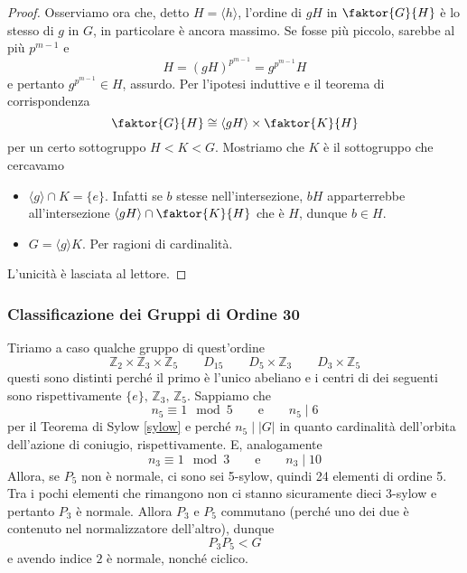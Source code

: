 \begin{multicols}{2}
\begin{proof}
	Osserviamo ora che, detto $ H = \langle h \rangle $, l'ordine di $ gH $ in $ \faktor{G}{H} $ è lo stesso di $ g $ in $ G $, in particolare è ancora massimo. Se fosse più piccolo, sarebbe al più $ p^{m-1} $ e
	\[ H = (gH)^{p^{m-1}} = g^{p^{m-1}}H \]
	e pertanto $ g^{p^{m-1}} \in H $, assurdo.
	 Per l'ipotesi induttive e il teorema di corrispondenza
	\[ \faktor{G}{H} \cong \langle gH \rangle \times \faktor{K}{H} \]
	per un certo sottogruppo $ H < K < G $. Mostriamo che $ K $ è il sottogruppo che cercavamo
	\begin{itemize}
		\item $ \langle g \rangle \cap K = \{e\} $. Infatti se $ b $ stesse nell'intersezione, $ bH $ apparterrebbe all'intersezione $ \langle gH \rangle \cap \faktor{K}{H} $ che è $ H $, dunque $ b \in H $.
		\item $ G = \langle g \rangle K $. Per ragioni di cardinalità. 
	\end{itemize}

L'unicità è lasciata al lettore.

\end{proof}
	
\subsubsection{Classificazione dei Gruppi di Ordine 30}
Tiriamo a caso qualche gruppo di quest'ordine
\[ \boxed{\mathbb{Z}_2\times\mathbb{Z}_3\times\mathbb{Z}_5} \qquad \boxed{D_{15}} \qquad \boxed{D_5\times\mathbb{Z}_3} \qquad \boxed{D_{3}\times\mathbb{Z}_5} \]
questi sono distinti perché il primo è l'unico abeliano e i centri di dei seguenti sono rispettivamente $ \{e\},\, \mathbb{Z}_3,\, \mathbb{Z}_5 $. Sappiamo che
\[ n_5 \equiv 1 \mod{5} \qquad\text{e}\qquad n_5 \mid 6 \]
per il Teorema di Sylow \ref{sylow} e perché $ n_5 \mid |G| $ in quanto cardinalità dell'orbita dell'azione di coniugio, rispettivamente. E, analogamente
\[ n_3 \equiv 1 \mod{3} \qquad\text{e}\qquad n_3 \mid 10 \]
Allora, se $ P_5 $ non è normale, ci sono sei 5-sylow, quindi 24 elementi di ordine 5. Tra i pochi elementi che rimangono non ci stanno sicuramente dieci 3-sylow e pertanto $ P_3 $ è normale. Allora $ P_3 $ e $ P_5 $ commutano (perché uno dei due è contenuto nel normalizzatore dell'altro), dunque
\[ P_3P_5 < G \]
e avendo indice $ 2 $ è normale, nonché ciclico.


\end{multicols}
